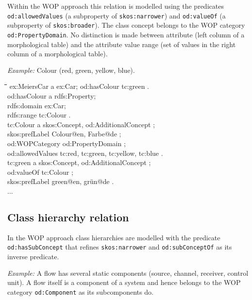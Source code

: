 \documentclass[11pt,a4paper]{article}
\newenvironment{code}{\tt \begin{tabbing}
\hskip12pt\=\hskip12pt\=\hskip12pt\=\hskip12pt\=\hskip5cm\=\hskip5cm\=\kill}
{\end{tabbing}}
\def\dq{{\char34}}
\begin{document}
Within the WOP approach this relation is modelled using the predicates
\texttt{od:allowedValues} (a subproperty of \texttt{skos:narrower}) and
\texttt{od:valueOf} (a subproperty of \texttt{skos:broader}). The class
concept belongs to the WOP category \texttt{od:PropertyDomain}. No distinction
is made between attribute (left column of a morphological table) and the
attribute value range (set of values in the right column of a morphological
table).

\emph{Example:}  Colour (red, green, yellow, blue).

\begin{code}
  ex:MeiersCar a ex:Car; od:hasColour tc:green . \\[4pt]
    
  od:hasColour a rdfs:Property;\\
    \>rdfs:domain ex:Car;\\
    \>rdfs:range tc:Colour .\\[4pt]

  tc:Colour a skos:Concept, od:AdditionalConcept ;\\
  \>skos:prefLabel {\dq}Colour{\dq}@en, {\dq}Farbe{\dq}@de ;\\
  \>od:WOPCategory od:PropertyDomain ;\\
  \>od:allowedValues tc:red, tc:green, tc:yellow, tc:blue .\\[4pt]

  tc:green a skos:Concept, od:AdditionalConcept ;\\
  \>od:valueOf tc:Colour ; \\
  \>skos:prefLabel {\dq}green{\dq}@en, {\dq}grün{\dq}@de .\\[4pt]
  ...  
\end{code}

\subsection{Class hierarchy relation}

In the WOP approach class hierarchies are modelled with the predicate
\texttt{od:hasSubConcept} that refines \texttt{skos:narrower} and
\texttt{od:subConceptOf} as its inverse predicate.

\emph{Example:}  A flow has several static components (source, channel,
receiver, control unit).  A flow itself is a component of a system and hence
belongs to the WOP category \texttt{od:Component} as its subcomponents do. 
\end{document}
